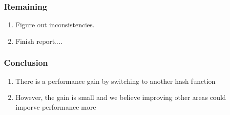 \documentclass[screen]{beamer}
\begin{document}
\begin{frame}
    \frametitle{Remaining}
    \begin{enumerate}
        \item Figure out inconsistencies.
        \item Finish report....
    \end{enumerate}
\end{frame}

\begin{frame}
    \frametitle{Conclusion}
    \begin{enumerate}
        \item There is a performance gain by switching to another hash
        function
        \item However, the gain is small and we believe improving other areas
        could imporve performance more
    \end{enumerate}
\end{frame}
\end{document}
